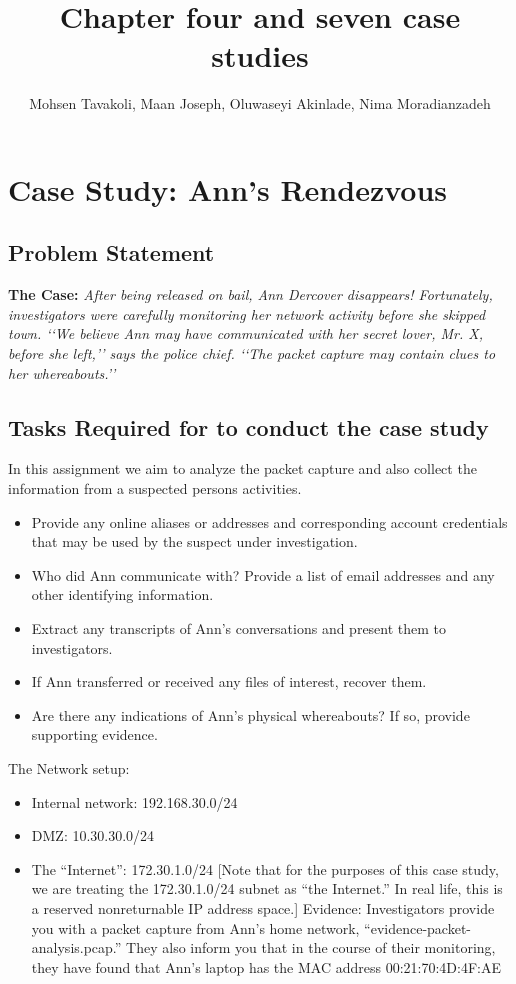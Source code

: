 \documentclass{article}
\title{Chapter four and seven case studies}
\author{Mohsen Tavakoli, Maan Joseph, Oluwaseyi Akinlade, Nima Moradianzadeh}
\begin{document}
\maketitle
\section{Case Study: Ann’s Rendezvous}
\subsection{Problem Statement}
\textbf{The Case:} \textit{After being released on bail, Ann Dercover disappears! Fortunately, investigators were carefully monitoring her network activity before she skipped town. ‘‘We believe Ann may have communicated with her secret lover, Mr. X, before she left,’’ says the police chief. ‘‘The packet capture may contain clues to her whereabouts.’’} \cite{davidoff2012network}

\subsection{Tasks Required for to conduct the case study}
In this assignment we aim to analyze the packet capture and also collect the information from a suspected persons activities.
 
\begin{itemize}
\item Provide any online aliases or addresses and corresponding account credentials that
may be used by the suspect under investigation.
\item Who did Ann communicate with? Provide a list of email addresses and any other
identifying information.
\item Extract any transcripts of Ann’s conversations and present them to investigators.
\item If Ann transferred or received any files of interest, recover them.
\item Are there any indications of Ann’s physical whereabouts? If so, provide supporting evidence.
\end{itemize}
The Network setup:
\begin{itemize}
\item Internal network: 192.168.30.0/24
\item DMZ: 10.30.30.0/24
\item The “Internet”: 172.30.1.0/24 [Note that for the purposes of this case study, we are
treating the 172.30.1.0/24 subnet as “the Internet.” In real life, this is a reserved nonreturnable
IP address space.]
Evidence: Investigators provide you with a packet capture from Ann’s home network,
“evidence-packet-analysis.pcap.” They also inform you that in the course of their monitoring,
they have found that Ann’s laptop has the MAC address 00:21:70:4D:4F:AE 
\end{itemize}
\end{document}
